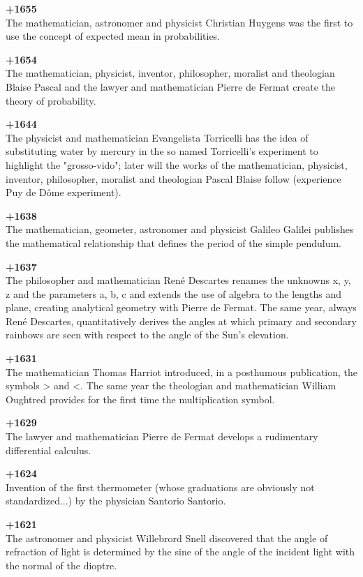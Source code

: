 \textbf{+1655}\\
The mathematician, astronomer and physicist Christian Huygens was the first to use the concept of expected mean in probabilities.

\textbf{+1654}\\
The mathematician, physicist, inventor, philosopher, moralist and theologian Blaise Pascal and the lawyer and mathematician Pierre de Fermat create the theory of probability.

\textbf{+1644}\\
The physicist and mathematician Evangelista Torricelli has the idea of substituting water by mercury in the so named Torricelli's experiment to highlight the "grosso-vido"; later will the works of the mathematician, physicist, inventor, philosopher, moralist and theologian Pascal Blaise follow (experience Puy de Dôme experiment).

\textbf{+1638}\\
The mathematician, geometer, astronomer and physicist Galileo Galilei publishes the mathematical relationship that defines the period of the simple pendulum.

\pagebreak
\textbf{+1637}\\
The philosopher and mathematician René Descartes renames the unknowns x, y, z and the parameters a, b, c and extends the use of algebra to the lengths and plane, creating analytical geometry with Pierre de Fermat. The same year, always René Descartes, quantitatively derives the angles at which primary and secondary rainbows are seen with respect to the angle of the Sun's elevation.

\textbf{+1631}\\
The mathematician Thomas Harriot introduced, in a posthumous publication, the symbols > and <. The same year the theologian and mathematician William Oughtred provides for the first time the multiplication symbol.

\textbf{+1629}\\
The lawyer and mathematician Pierre de Fermat develops a rudimentary differential calculus.

\textbf{+1624}\\
Invention of the first thermometer (whose graduations are obviously not standardized...) by the physician Santorio Santorio.

\textbf{+1621}\\
The astronomer and physicist Willebrord Snell discovered that the angle of refraction of light is determined by the sine of the angle of the incident light with the normal of the dioptre.

